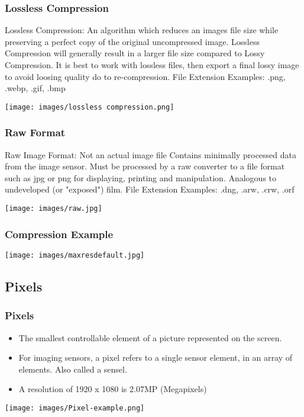 \documentclass{beamer}
\begin{document}
	\begin{frame}
	\frametitle{Lossless Compression}
	\begin{outline}
		\1 Lossless Compression:
		\2 An algorithm which reduces an images file size while preserving a perfect copy of the original uncompressed image.  
		\2 Lossless Compression will generally result in a larger file size compared to Lossy Compression.  
		\2 It is best to work with lossless files, then export a final lossy image to avoid loosing quality do to re-compression.
		\1 File Extension Examples:  
		\2 .png, .webp, .gif, .bmp
	\end{outline}
	\begin{center}
		\texttt{[image: images/lossless compression.png]}
	\end{center}
\end{frame}

	\begin{frame}
	\frametitle{Raw Format}
	\begin{outline}
		\1 Raw Image Format:  
		\2 Not an actual image file
		\2 Contains minimally processed data from the image sensor.
		\2 Must be processed by a raw converter to a file format such as jpg or png for displaying, printing and manipulation.
		\1 Analogous to undeveloped (or "exposed") film.  
		\1 File Extension Examples:  
		\2 .dng, .arw, .crw, .orf
		\end{outline}
	\begin{center}
		\texttt{[image: images/raw.jpg]}
	\end{center}
\end{frame}

		\begin{frame}
	\frametitle{Compression Example}
	
	\begin{center}
		\texttt{[image: images/maxresdefault.jpg]}
	\end{center}
\end{frame}

\subsection{Pixels}
\begin{frame}
	\frametitle{Pixels}
	\begin{itemize}
		\item The smallest controllable element of a picture represented on the screen.  
		\item For imaging sensors, a pixel refers to a single sensor element, in an array of elements.  Also called a sensel.  
		\item A resolution of 1920 x 1080 is 2.07MP (Megapixels)
	\end{itemize}
	\begin{center}
		\texttt{[image: images/Pixel-example.png]}
	\end{center}
\end{frame}
	
\end{document}
